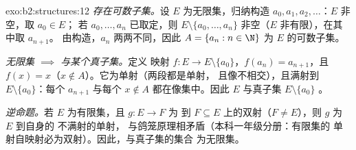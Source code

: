 \begin{solution}{exo:b2:structures:12}
\emph{存在可数子集。}设 $E$ 为无限集，归纳构造 $a_0,
a_1, a_2, \dots$：$E$ 非空，取 $a_0 \in E$；
若 $a_0, \dots, a_n$ 已取定，则 $E \setminus \{a_0, \dots,
a_n\}$ 非空（$E$ 非有限），在其中取 $a_{n+1}$。
由构造，$a_n$ 两两不同，因此 $A = \{a_n : n
\in \N\}$ 为 $E$ 的可数子集。

\emph{无限集 $\implies$ 与某个真子集。}定义
映射 $f \colon E \to E \setminus \{a_0\}$，$f(a_n) = a_{n+1}$，且
$f(x) = x$（$x \notin A$）。它为单射（两段都是单射，
且像不相交），且满射到 $E \setminus
\{a_0\}$：每个 $a_{n+1}$ 与每个 $x \notin A$ 都在像集中。因此
$E$ 与真子集 $E \setminus \{a_0\}$ 。

\emph{逆命题。}若 $E$ 为有限集，且 $g \colon E \to F$ 为
到 $F \subseteq E$ 上的双射（$F \neq E$），则 $g$ 为 $E$ 到自身的
不满射的单射，
与鸽笼原理相矛盾（本科一年级分册：有限集的
单射自映射必为双射）。因此，与真子集的集合
为无限集。
\end{solution}

